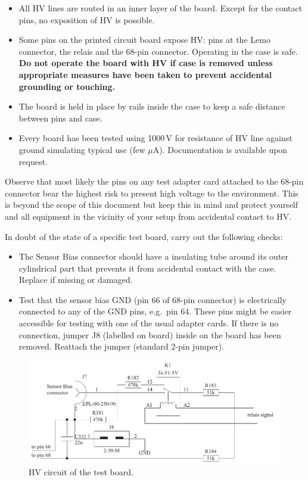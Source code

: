 \begin{itemize}
    \item All HV lines are routed in an inner layer of the board. Except for the contact pins, no exposition of HV is possible.
    \item Some pins on the printed circuit board expose HV: pins at the Lemo connector, the relais and the 68-pin connector. Operating in the case is safe. \textbf{Do not operate the board with HV if case is removed unless appropriate measures have been taken to prevent accidental grounding or touching.}
    \item The board is held in place by rails inside the case to keep a safe distance between pins and case.
    \item Every board has been tested using 1000\,V for resistance of HV line against ground simulating typical use (few $\mu$A). Documentation is available upon request.
\end{itemize}

Observe that most likely the pins on any test adapter card attached to the 68-pin connector bear the highest risk to present high voltage to the environment. This is beyond the scope of this document but keep this in mind and protect yourself and all equipment in the vicinity of your setup from accidental contact to HV.

In doubt of the state of a specific test board, carry out the following checks:
\begin{itemize}
    \item The Sensor Bias connector should have a insulating tube around its outer cylindrical part that prevents it from accidental contact with the case. Replace if missing or damaged.
    \item Test that the sensor bias GND (pin 66 of 68-pin connector) is electrically connected to any of the GND pins, e.g.~pin 64. These pins might be easier accessible for testing with one of the usual adapter cards. If there is no connection, jumper J8 (labelled on board) inside on the board has been removed. Reattach the jumper (standard 2-pin jumper).
\end{itemize}

\begin{figure}[hbtp]
    \begin{center}
	\includegraphics[width=.8\textwidth]{img/hvcircuit.pdf}
	\caption{HV circuit of the test board.}
	\label{fig:hvcircuit}
    \end{center}
\end{figure}

